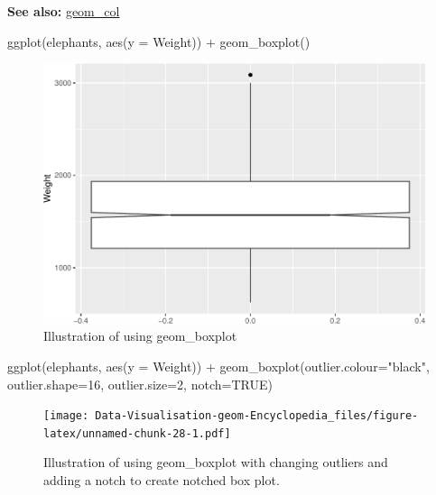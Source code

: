 \documentclass[
]{book}
\newenvironment{Shaded}{\begin{snugshade}}{\end{snugshade}}
\newcommand{\AttributeTok}[1]{\textcolor[rgb]{0.77,0.63,0.00}{#1}}
\newcommand{\ConstantTok}[1]{\textcolor[rgb]{0.00,0.00,0.00}{#1}}
\newcommand{\DecValTok}[1]{\textcolor[rgb]{0.00,0.00,0.81}{#1}}
\newcommand{\FunctionTok}[1]{\textcolor[rgb]{0.00,0.00,0.00}{#1}}
\newcommand{\NormalTok}[1]{#1}
\newcommand{\SpecialCharTok}[1]{\textcolor[rgb]{0.00,0.00,0.00}{#1}}
\newcommand{\StringTok}[1]{\textcolor[rgb]{0.31,0.60,0.02}{#1}}
\begin{document}
\textbf{See also: } \protect\hyperlink{col}{geom\_col}

\begin{Shaded}
\begin{Highlighting}[]
\FunctionTok{ggplot}\NormalTok{(elephants, }\FunctionTok{aes}\NormalTok{(}\AttributeTok{y =}\NormalTok{ Weight)) }\SpecialCharTok{+} 
  \FunctionTok{geom\_boxplot}\NormalTok{()}
\end{Highlighting}
\end{Shaded}

\begin{figure}
\centering
\includegraphics{Data-Visualisation-geom-Encyclopedia_files/figure-latex/unnamed-chunk-27-1.pdf}
\caption{\label{fig:unnamed-chunk-27}Illustration of using geom\_boxplot}
\end{figure}

\begin{Shaded}
\begin{Highlighting}[]
\FunctionTok{ggplot}\NormalTok{(elephants, }\FunctionTok{aes}\NormalTok{(}\AttributeTok{y =}\NormalTok{ Weight)) }\SpecialCharTok{+} 
\FunctionTok{geom\_boxplot}\NormalTok{(}\AttributeTok{outlier.colour=}\StringTok{"black"}\NormalTok{, }\AttributeTok{outlier.shape=}\DecValTok{16}\NormalTok{,}
             \AttributeTok{outlier.size=}\DecValTok{2}\NormalTok{, }\AttributeTok{notch=}\ConstantTok{TRUE}\NormalTok{)}
\end{Highlighting}
\end{Shaded}

\begin{figure}
\centering
\texttt{[image: Data-Visualisation-geom-Encyclopedia\_files/figure-latex/unnamed-chunk-28-1.pdf]}
\caption{\label{fig:unnamed-chunk-28}Illustration of using geom\_boxplot with changing outliers and adding a notch to create notched box plot.}
\end{figure}
\end{document}
